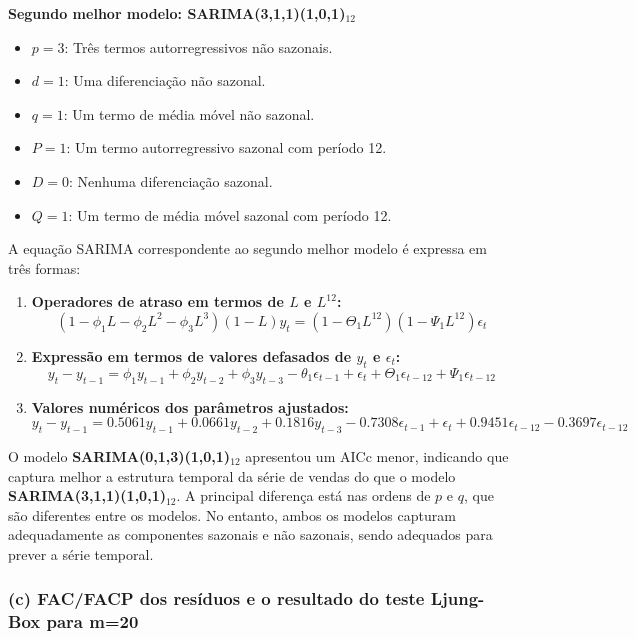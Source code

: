 \documentclass[a4paper, 12pt]{article}
\begin{document}
\textbf{Segundo melhor modelo: SARIMA(3,1,1)(1,0,1)$_{12}$}

\begin{itemize}
    \item \( p = 3 \): Três termos autorregressivos não sazonais.
    \item \( d = 1 \): Uma diferenciação não sazonal.
    \item \( q = 1 \): Um termo de média móvel não sazonal.
    \item \( P = 1 \): Um termo autorregressivo sazonal com período 12.
    \item \( D = 0 \): Nenhuma diferenciação sazonal.
    \item \( Q = 1 \): Um termo de média móvel sazonal com período 12.
\end{itemize}

A equação SARIMA correspondente ao segundo melhor modelo é expressa em três formas:

\begin{enumerate}
    \item \textbf{Operadores de atraso em termos de \( L \) e \( L^{12} \):}
    \[
    (1 - \phi_1 L - \phi_2 L^2 - \phi_3 L^3)(1 - L) y_t = (1 - \Theta_1 L^{12})(1 - \Psi_1 L^{12}) \epsilon_t
    \]
    
    \item \textbf{Expressão em termos de valores defasados de \( y_t \) e \( \epsilon_t \):}
    \[
    y_t - y_{t-1} = \phi_1 y_{t-1} + \phi_2 y_{t-2} + \phi_3 y_{t-3} - \theta_1 \epsilon_{t-1} + \epsilon_t + \Theta_1 \epsilon_{t-12} + \Psi_1 \epsilon_{t-12}
    \]

    \item \textbf{Valores numéricos dos parâmetros ajustados:}
    \[
    y_t - y_{t-1} = 0.5061 y_{t-1} + 0.0661 y_{t-2} + 0.1816 y_{t-3} - 0.7308 \epsilon_{t-1} + \epsilon_t + 0.9451 \epsilon_{t-12} - 0.3697 \epsilon_{t-12}
    \]
\end{enumerate}

O modelo \textbf{SARIMA(0,1,3)(1,0,1)$_{12}$} apresentou um AICc menor, indicando que captura melhor a estrutura temporal da série de vendas do que o modelo \textbf{SARIMA(3,1,1)(1,0,1)$_{12}$}. A principal diferença está nas ordens de \( p \) e \( q \), que são diferentes entre os modelos. No entanto, ambos os modelos capturam adequadamente as componentes sazonais e não sazonais, sendo adequados para prever a série temporal.


\subsubsection{(c) FAC/FACP dos resíduos e o resultado do teste Ljung-Box para m=20}
\end{document}
